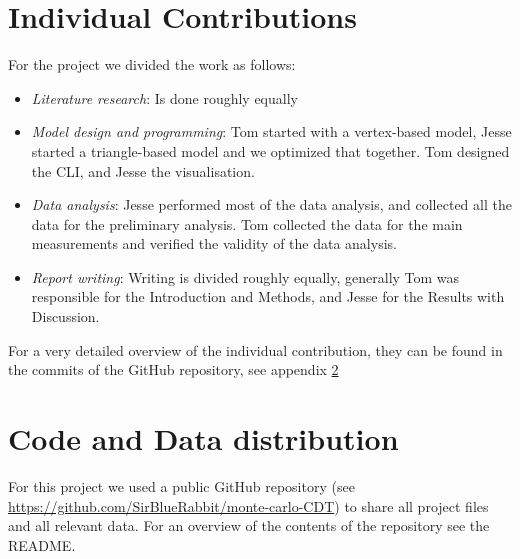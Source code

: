\documentclass{article}
\begin{document}
\section{Individual Contributions}
For the project we divided the work as follows:
\begin{itemize}
    \item \textit{Literature research}: Is done roughly equally
    \item \textit{Model design and programming}: Tom started with a vertex-based model, Jesse started a triangle-based model and we optimized that together. Tom designed the CLI, and Jesse the visualisation.
    \item \textit{Data analysis}: Jesse performed most of the data analysis, and collected all the data for the preliminary analysis. Tom collected the data for the main measurements and verified the validity of the data analysis.
    \item \textit{Report writing}: Writing is divided roughly equally, generally Tom was responsible for the Introduction and Methods, and Jesse for the Results with Discussion.
\end{itemize}
For a very detailed overview of the individual contribution, they can be found in the commits of the GitHub repository, see appendix \ref{sec:coderepo}

\section{Code and Data distribution} \label{sec:coderepo}
For this project we used a public GitHub repository (see \url{https://github.com/SirBlueRabbit/monte-carlo-CDT}) to share all project files and all relevant data.
For an overview of the contents of the repository see the \textsc{README}.
\end{document}
